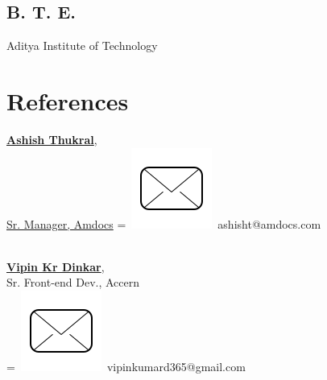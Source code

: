 \documentclass[]{standardcv}
\begin{document}
\begin{minipage}[t]{0.25\textwidth}
\sectionsep
\subsection{B. T. E.}
Aditya Institute of Technology \\
\sectionsep


\section{References} 
\href{https://www.linkedin.com/in/ashish-thukral-60b5242/}{\textbf{Ashish Thukral}, \\ Sr. Manager, Amdocs}
\begingroup
{}=\hbox{
\includegraphics[scale=0.1,trim={0 1cm 0cm 0cm}]{icons/main/mail.png}\hspace{0.3cm} ashisht@amdocs.com
}
\parbox{\wd0}{}
\endgroup
\\
\sectionsep
\href{https://www.linkedin.com/in/vkd/}{\textbf{Vipin Kr Dinkar}}, \\Sr. Front-end Dev., Accern 
\\
\begingroup
{}=\hbox{
\includegraphics[scale=0.1,trim={0 1cm 0cm 0cm}]{icons/main/mail.png}\hspace{0.3cm} vipinkumard365@gmail.com
}
\parbox{\wd0}{}
\endgroup
\\




\end{minipage}
\end{document}
